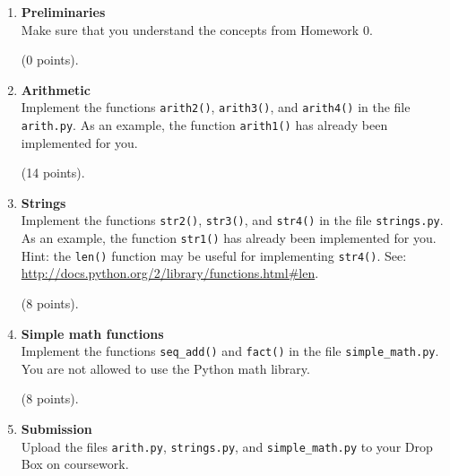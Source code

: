 \documentclass{article}
\newcounter{points}
\newcommand\setpoints[1]{\addtocounter{points}{#1}(#1 points)}
\begin{document}
\begin{enumerate}

\item \textbf{Preliminaries} \\
 Make sure that you understand the concepts from Homework 0. \setpoints{0}.







\item \textbf{Arithmetic} \\
Implement the functions \texttt{arith2()}, \texttt{arith3()}, and \texttt{arith4()} in the file \texttt{arith.py}.  As an example, the function \texttt{arith1()} has already been implemented for you.  \setpoints{14}.

\item \textbf{Strings} \\
Implement the functions \texttt{str2()}, \texttt{str3()}, and \texttt{str4()} in the file \texttt{strings.py}.  As an example, the function \texttt{str1()} has already been implemented for you. Hint: the \texttt{len()} function may be useful for implementing \texttt{str4()}.  See: \url{http://docs.python.org/2/library/functions.html#len}. \setpoints{8}.  

\item \textbf{Simple math functions} \\
Implement the functions \texttt{seq\_add()} and \texttt{fact()} in the file \texttt{simple\_math.py}.  You are not allowed to use the Python math library. \setpoints{8}.

\item \textbf{Submission} \\
Upload the files \texttt{arith.py}, \texttt{strings.py}, and \texttt{simple\_math.py} to your Drop Box on coursework.
\end{enumerate}
\end{document}
